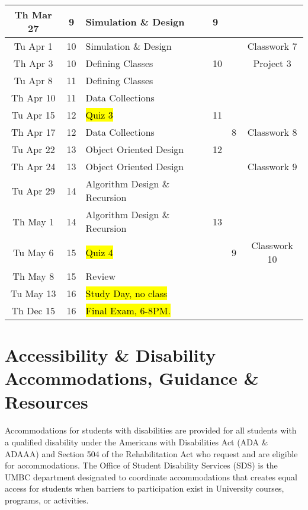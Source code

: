 \documentclass[letter,10pt]{article}
\begin{document}
\begin{tabular}{c c l l l c}
Th Mar 27  & 9 & Simulation \& Design & 9 & & \\ \hline
Tu Apr 1     & 10 & Simulation \& Design & & & Classwork 7 \\ 
Th Apr 3     & 10 & Defining Classes & 10 & & Project 3\\
Tu Apr 8     & 11 & Defining Classes & & & \\
Th Apr 10   & 11 & Data Collections & & & \\
Tu Apr 15   & 12 & \hl{Quiz 3}  & 11 & &  \\
Th Apr 17   & 12 & Data Collections & & 8 & Classwork 8\\
Tu Apr 22   & 13 & Object Oriented Design & 12 & & \\
Th Apr 24   & 13 & Object Oriented Design & & & Classwork 9 \\
Tu Apr 29   & 14 & Algorithm Design \& Recursion & & & \\ \hline
Th May 1    & 14 & Algorithm Design \& Recursion & 13 & & \\
Tu May 6    & 15 & \hl{Quiz 4} & & 9 & Classwork 10 \\
Th May 8    & 15 & Review & & & \\
Tu May 13  & 16 & \hl{Study Day, no class} & & & \\
Th Dec 15  & 16 & \hl{Final Exam, 6-8PM.} & & & \\
\end{tabular}

\section*{Accessibility \& Disability Accommodations, Guidance \& Resources}
\paragraph{}Accommodations for students with disabilities are provided for all students with a qualified disability under the Americans with Disabilities Act (ADA \& ADAAA) and Section 504 of the Rehabilitation Act who request and are eligible for accommodations. The Office of Student Disability Services (SDS) is the UMBC department designated to coordinate accommodations that creates equal access for students when barriers to participation exist in University courses, programs, or activities.
\end{document}

